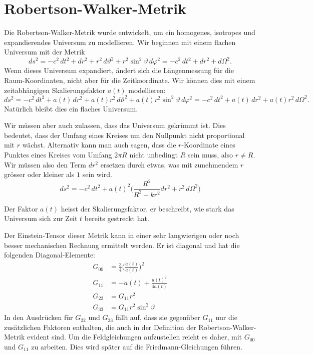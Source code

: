\section{Robertson-Walker-Metrik}
Die Robertson-Walker-Metrik wurde entwickelt, um ein homogenes,
isotropes und expandierendes Universum zu modellieren.
Wir beginnen mit einem flachen Universum mit der
Metrik
\[
ds^2
=
-c^2\,dt^2 + dr^2 + r^2\,d\vartheta^2 + r^2\sin^2\vartheta \,d\varphi^2
=
-c^2\,dt^2 + dr^2 + d\Omega^2.
\]
Wenn dieses Universum expandiert, ändert sich die Längenmessung für die
Raum-Koordinaten, nicht aber für die Zeitkoordinate.
Wir können dies mit einem zeitabhängigen Skalierungsfaktor $a(t)$ 
modellieren:
\[
ds^2
=
-c^2\,dt^2 + a(t)\,dr^2 + a(t)r^2\,d\vartheta^2 + a(t)r^2 \sin^2\vartheta\,d\varphi^2
=
-c^2\,dt^2 + a(t)\,dr^2 + a(t)r^2\,d\Omega^2.
\]
Natürlich bleibt dies ein flaches Universum.

Wir müssen aber auch zulassen, dass das Universum gekrümmt ist.
Dies bedeutet, dass der Umfang eines Kreises um den Nullpunkt
nicht proportional mit $r$ wächst.
Alternativ kann man auch sagen, dass die $r$-Koordinate eines Punktes 
eines Kreises vom Umfang $2\pi R$ nicht unbedingt $R$ sein muss, also
$r \ne R$.
Wir müssen also den Term $dr^2$ ersetzen durch etwas, was mit zunehmendem
$r$ grösser oder kleiner als $1$ sein wird.
\[
ds^2
=
-c^2\,dt^2
+ a(t)^2 \biggl(
\frac{R^2}{R^2-kr^2} dr^2
+
r^2\, d\Omega^2
\biggr)
\]

Der Faktor $a(t)$ heisst der Skalierungsfaktor, er beschreibt, wie stark
das Universum sich zur Zeit $t$ bereits gestreckt hat.

Der Einstein-Tensor dieser Metrik kann in einer sehr langwierigen oder
noch besser mechanischen Rechnung ermittelt werden.
Er ist diagonal und hat die folgenden Diagonal-Elemente:
\begin{align*}
G_{00}
&=
\frac{3}{4}\biggl(\frac{\dot a(t)}{a(t)}\biggr)^2
\\
G_{11}
&=
-\ddot a(t) +\frac{\dot a(t)^2}{4a(t)}
\\
G_{22}
&=
G_{11} r^2
\\
G_{33}
&=
G_{11} r^2\sin^2\vartheta
\end{align*}
In den Ausdrücken für $G_{22}$ und $G_{33}$ fällt auf, dass sie gegenüber
$G_{11}$ nur die zusätzlichen Faktoren enthalten, die auch in der Definition
der Robertson-Walker-Metrik evident sind.
Um die Feldgleichungen aufzustellen reicht es daher, mit $G_{00}$ und
$G_{11}$ zu arbeiten.
Dies wird später auf die Friedmann-Gleichungen führen.

